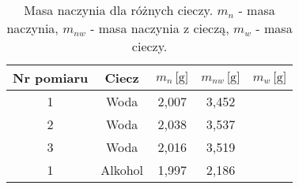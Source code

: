 \begin{table}[H]
    \centering
    \begin{tabular}{|c|c|c|c|c|}
        \hline
        \textbf{Nr pomiaru} & \textbf{Ciecz} & $m_n\,\text{[g]}$ & $m_{nw}\,\text{[g]}$ & $m_{w}\,\text{[g]}$ \\
        \hline
        1 & Woda & 2{,}007 & 3{,}452 &  \\
        2 & Woda & 2{,}038 & 3{,}537 &  \\
        3 & Woda & 2{,}016 & 3{,}519 &  \\
        \hline
        1 & Alkohol & 1{,}997 & 2{,}186 & \\
        \hline
    \end{tabular}
    \caption{Masa naczynia dla różnych cieczy. $m_n$ - masa naczynia, $m_{nw}$ - masa naczynia z cieczą, $m_w$ - masa cieczy.}
    \label{tab:stalagmometr}
\end{table}